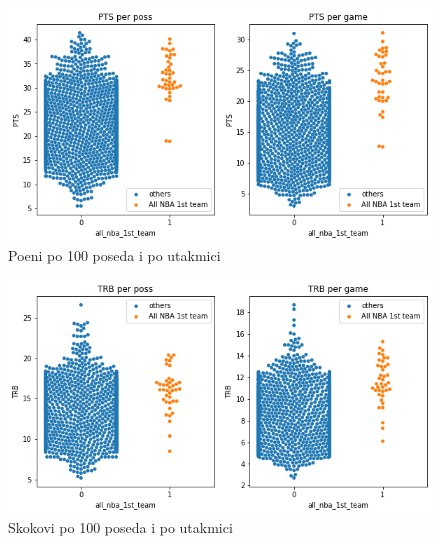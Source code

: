 \documentclass[a4paper]{article}
\begin{document}
\begin{figure}[h!]
\begin{center}
\includegraphics[scale=0.40]{swarm_plot_pts.png}
\end{center}
\caption{Poeni po 100 poseda i po utakmici}
\label{plt:swarm_plot_pts}
\end{figure}

\begin{figure}[h!]
\begin{center}
\includegraphics[scale=0.40]{swarm_plot_trb.png}
\end{center}
\caption{Skokovi po 100 poseda i po utakmici}
\label{plt:swarm_plot_trb}
\end{figure}
\end{document}
